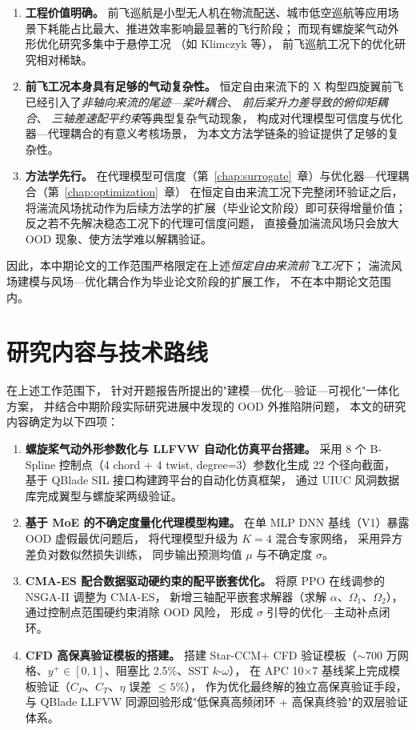 \begin{enumerate}
  \item \textbf{工程价值明确。}
        前飞巡航是小型无人机在物流配送、城市低空巡航等应用场景下耗能占比最大、推进效率影响最显著的飞行阶段；
        而现有螺旋桨气动外形优化研究多集中于悬停工况
        （如 Klimczyk\cite{Klimczyk2022} 等），
        前飞巡航工况下的优化研究相对稀缺。
  \item \textbf{前飞工况本身具有足够的气动复杂性。}
        恒定自由来流下的 X 构型四旋翼前飞已经引入了\emph{非轴向来流的尾迹—桨叶耦合}、
        \emph{前后桨升力差导致的俯仰矩耦合}、
        \emph{三轴差速配平约束}等典型复杂气动现象，
        构成对代理模型可信度与优化器—代理耦合的有意义考核场景，
        为本文方法学链条的验证提供了足够的复杂性。
  \item \textbf{方法学先行。}
        在代理模型可信度（第~\ref{chap:surrogate}~章）与优化器—代理耦合（第~\ref{chap:optimization}~章）
        在恒定自由来流工况下完整闭环验证之后，
        将湍流风场扰动作为后续方法学的扩展（毕业论文阶段）即可获得增量价值；
        反之若不先解决稳态工况下的代理可信度问题，
        直接叠加湍流风场只会放大 OOD 现象、使方法学难以解耦验证。
\end{enumerate}

因此，本中期论文的工作范围严格限定在上述\emph{恒定自由来流前飞工况}下；
湍流风场建模与风场—优化耦合作为毕业论文阶段的扩展工作，
不在本中期论文范围内。

\section{研究内容与技术路线}

在上述工作范围下，
针对开题报告所提出的"建模—优化—验证—可视化"一体化方案，
并结合中期阶段实际研究进展中发现的 OOD 外推陷阱问题，
本文的研究内容确定为以下四项：

\begin{enumerate}
  \item \textbf{螺旋桨气动外形参数化与 LLFVW 自动化仿真平台搭建。}
        采用 8 个 B-Spline 控制点（4 chord + 4 twist, degree=3）参数化生成 22 个径向截面，
        基于 QBlade SIL 接口构建跨平台的自动化仿真框架，
        通过 UIUC 风洞数据库完成翼型与螺旋桨两级验证。
  \item \textbf{基于 MoE 的不确定度量化代理模型构建。}
        在单 MLP DNN 基线（V1）暴露 OOD 虚假最优问题后，
        将代理模型升级为 $K=4$ 混合专家网络，
        采用异方差负对数似然损失训练，
        同步输出预测均值 $\mu$ 与不确定度 $\sigma$。
  \item \textbf{CMA-ES 配合数据驱动硬约束的配平嵌套优化。}
        将原 PPO 在线调参的 NSGA-II 调整为 CMA-ES，
        新增三轴配平嵌套求解器（求解 $\alpha$、$\Omega_1$、$\Omega_2$），
        通过控制点范围硬约束消除 OOD 风险，
        形成 $\sigma$ 引导的优化—主动补点闭环。
  \item \textbf{CFD 高保真验证模板的搭建。}
        搭建 Star-CCM+ CFD 验证模板（$\sim 700$ 万网格、$y^+ \in [0,1]$、阻塞比 2.5\%、SST $k$-$\omega$），
        在 APC 10$\times$7 基线桨上完成模板验证（$C_P$、$C_T$、$\eta$ 误差 $\leq 5\%$），
        作为优化最终解的独立高保真验证手段，
        与 QBlade LLFVW 同源回验形成"低保真高频闭环 + 高保真终验"的双层验证体系。
\end{enumerate}

